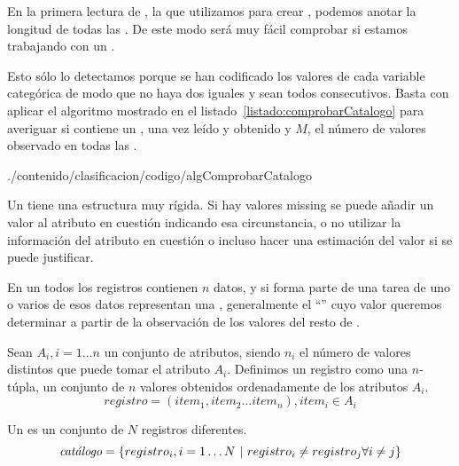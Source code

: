 En la primera lectura de \D, la que utilizamos para crear \aprioriC[1], podemos anotar la longitud de todas las \transacciones. De este modo será muy fácil comprobar si estamos trabajando con un \catalogo.

Esto sólo lo detectamos porque se han codificado los valores de cada variable categórica de modo que no haya dos iguales y sean todos consecutivos. Basta con aplicar el algoritmo mostrado en el listado~\ref{listado:comprobarCatalogo} para averiguar si \D contiene un \catalogo, una vez leído y obtenido \aprioriC[1] y $M$, el número de valores observado en todas las \transacciones.


                 {./contenido/clasificacion/codigo/algComprobarCatalogo}



Un \catalogo tiene una estructura muy rígida. Si hay valores missing se puede añadir un valor al atributo en cuestión indicando esa circunstancia, o no utilizar la información del atributo en cuestión o incluso hacer una estimación del valor si se puede justificar.

En un \catalogo todos los registros contienen $n$ datos, y si forma parte de una tarea de \clasificacion uno o varios de esos datos representan una \clase, generalmente el "`\atributo"' cuyo valor queremos determinar a partir de la observación de los valores del resto de \atributos.

\begin{Definition}[Registro]
   Sean $A_i, i = 1 \ldots n$ un conjunto de atributos, siendo $n_i$ el número de valores distintos que puede tomar el atributo $A_i$. Definimos un registro como una $n$-túpla, un conjunto de $n$ valores obtenidos ordenadamente de los atributos $A_i$.
   $$registro = \left(item_1, item_2\ldots item_n\right), item_i \in A_i$$
\label{def:registro}
\end{Definition}

\begin{Definition}[\Catalogo] Un \catalogo es un conjunto de $N$ registros diferentes.
   $$\catalogo = \left\{registro_i, i = 1\ldots N\ | \ registro_i \neq registro_j \forall i \neq j\right\}$$
\label{def:catalogo}
\end{Definition}


